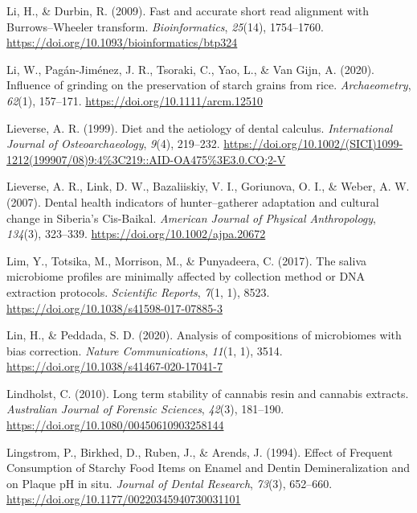 \documentclass[
  letterpaper,
]{book}
\newlength{\cslhangindent}
\newlength{\cslentryspacingunit} %
\newenvironment{CSLReferences}[2] %
 {%
  \setlength{\parindent}{0pt}
  \ifodd #1
  \let\oldpar\par
  \def\par{\hangindent=\cslhangindent\oldpar}
  \fi
  \setlength{\parskip}{#2\cslentryspacingunit}
 }%
 {}
\begin{document}
\begin{CSLReferences}{1}{0}
\leavevmode{}%
Li, H., \& Durbin, R. (2009). Fast and accurate short read alignment
with {Burrows}--{Wheeler} transform. \emph{Bioinformatics},
\emph{25}(14), 1754--1760.
\url{https://doi.org/10.1093/bioinformatics/btp324}

\leavevmode{}%
Li, W., Pagán-Jiménez, J. R., Tsoraki, C., Yao, L., \& Van Gijn, A.
(2020). Influence of grinding on the preservation of starch grains from
rice. \emph{Archaeometry}, \emph{62}(1), 157--171.
\url{https://doi.org/10.1111/arcm.12510}

\leavevmode{}%
Lieverse, A. R. (1999). Diet and the aetiology of dental calculus.
\emph{International Journal of Osteoarchaeology}, \emph{9}(4), 219--232.
\url{https://doi.org/10.1002/(SICI)1099-1212(199907/08)9:4\%3C219::AID-OA475\%3E3.0.CO;2-V}

\leavevmode{}%
Lieverse, A. R., Link, D. W., Bazaliiskiy, V. I., Goriunova, O. I., \&
Weber, A. W. (2007). Dental health indicators of hunter--gatherer
adaptation and cultural change in {Siberia}'s {Cis-Baikal}.
\emph{American Journal of Physical Anthropology}, \emph{134}(3),
323--339. \url{https://doi.org/10.1002/ajpa.20672}

\leavevmode{}%
Lim, Y., Totsika, M., Morrison, M., \& Punyadeera, C. (2017). The saliva
microbiome profiles are minimally affected by collection method or {DNA}
extraction protocols. \emph{Scientific Reports}, \emph{7}(1, 1), 8523.
\url{https://doi.org/10.1038/s41598-017-07885-3}

\leavevmode{}%
Lin, H., \& Peddada, S. D. (2020). Analysis of compositions of
microbiomes with bias correction. \emph{Nature Communications},
\emph{11}(1, 1), 3514. \url{https://doi.org/10.1038/s41467-020-17041-7}

\leavevmode{}%
Lindholst, C. (2010). Long term stability of cannabis resin and cannabis
extracts. \emph{Australian Journal of Forensic Sciences}, \emph{42}(3),
181--190. \url{https://doi.org/10.1080/00450610903258144}

\leavevmode{}%
Lingstrom, P., Birkhed, D., Ruben, J., \& Arends, J. (1994). Effect of
{Frequent Consumption} of {Starchy Food Items} on {Enamel} and {Dentin
Demineralization} and on {Plaque pH} in situ. \emph{Journal of Dental
Research}, \emph{73}(3), 652--660.
\url{https://doi.org/10.1177/00220345940730031101}


\end{CSLReferences}
\end{document}
